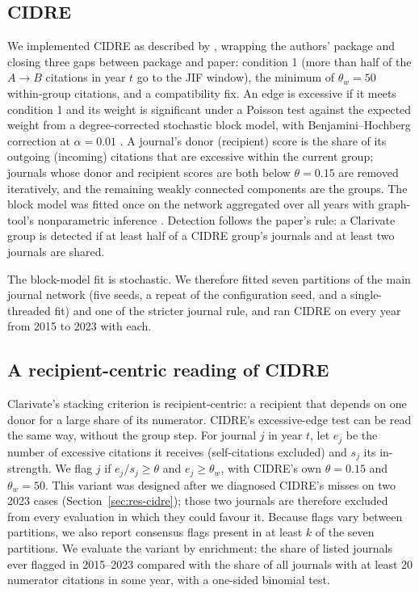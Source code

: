 \subsection{CIDRE}
We implemented CIDRE as described by \citet{kojaku2021cidre}, wrapping the authors' package and closing
three gaps between package and paper: condition 1 (more than half of the $A\!\to\!B$ citations in year $t$ go to the
JIF window), the minimum of $\theta_w=50$ within-group citations, and a compatibility fix. An edge is excessive if it
meets condition 1 and its weight is significant under a Poisson test against the expected weight from a
degree-corrected stochastic block model, with Benjamini--Hochberg correction at $\alpha=0.01$
\citep{benjamini1995}. A journal's donor (recipient) score is the share of its outgoing (incoming) citations that are
excessive within the current group; journals whose donor and recipient scores are both below $\theta=0.15$ are
removed iteratively, and the remaining weakly connected components are the groups. The block model was fitted once on
the network aggregated over all years with graph-tool's nonparametric inference
\citep{peixoto2017nonparametric,peixoto2014graphtool}. Detection follows the paper's rule: a Clarivate group is detected
if at least half of a CIDRE group's journals and at least two journals are shared.

The block-model fit is stochastic. We therefore fitted seven partitions of the main journal network (five seeds, a
repeat of the configuration seed, and a single-threaded fit) and one of the stricter journal rule, and ran CIDRE on
every year from 2015 to 2023 with each.

\subsection{A recipient-centric reading of CIDRE}
Clarivate's stacking criterion is recipient-centric: a recipient that depends on one donor for a large share of its
numerator. CIDRE's excessive-edge test can be read the same way, without the group step. For journal $j$ in year
$t$, let $e_j$ be the number of excessive citations it receives (self-citations excluded) and $s_j$ its in-strength.
We flag $j$ if $e_j/s_j \ge \theta$ and $e_j \ge \theta_w$, with CIDRE's own $\theta=0.15$ and $\theta_w=50$. This
variant was designed after we diagnosed CIDRE's misses on two 2023 cases (Section~\ref{sec:res-cidre}); those two
journals are therefore excluded from every evaluation in which they could favour it. Because flags vary between
partitions, we also report consensus flags present in at least $k$ of the seven partitions. We evaluate the variant by
enrichment: the share of listed journals ever flagged in 2015--2023 compared with the share of all journals with at
least 20 numerator citations in some year, with a one-sided binomial test.

